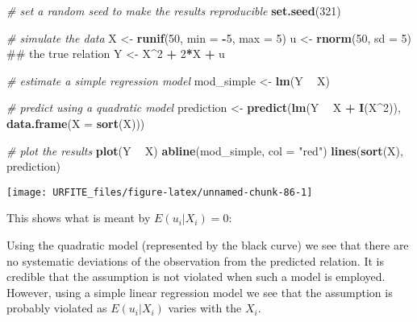 \documentclass[]{book}
\newenvironment{Shaded}{\begin{snugshade}}{\end{snugshade}}
\newcommand{\KeywordTok}[1]{\textcolor[rgb]{0.13,0.29,0.53}{\textbf{#1}}}
\newcommand{\DataTypeTok}[1]{\textcolor[rgb]{0.13,0.29,0.53}{#1}}
\newcommand{\DecValTok}[1]{\textcolor[rgb]{0.00,0.00,0.81}{#1}}
\newcommand{\StringTok}[1]{\textcolor[rgb]{0.31,0.60,0.02}{#1}}
\newcommand{\CommentTok}[1]{\textcolor[rgb]{0.56,0.35,0.01}{\textit{#1}}}
\newcommand{\OperatorTok}[1]{\textcolor[rgb]{0.81,0.36,0.00}{\textbf{#1}}}
\newcommand{\NormalTok}[1]{#1}
\theoremstyle{definition}
\theoremstyle{definition}
\theoremstyle{definition}
\theoremstyle{remark}
\begin{document}
\begin{Shaded}
\begin{Highlighting}[]
\CommentTok{# set a random seed to make the results reproducible}
\KeywordTok{set.seed}\NormalTok{(}\DecValTok{321}\NormalTok{)}

\CommentTok{# simulate the data }
\NormalTok{X <-}\StringTok{ }\KeywordTok{runif}\NormalTok{(}\DecValTok{50}\NormalTok{, }\DataTypeTok{min =} \OperatorTok{-}\DecValTok{5}\NormalTok{, }\DataTypeTok{max =} \DecValTok{5}\NormalTok{)}
\NormalTok{u <-}\StringTok{ }\KeywordTok{rnorm}\NormalTok{(}\DecValTok{50}\NormalTok{, }\DataTypeTok{sd =} \DecValTok{5}\NormalTok{)  }
\NormalTok{## the true relation  }
\NormalTok{Y <-}\StringTok{ }\NormalTok{X}\OperatorTok{^}\DecValTok{2} \OperatorTok{+}\StringTok{ }\DecValTok{2}\OperatorTok{*}\NormalTok{X }\OperatorTok{+}\StringTok{ }\NormalTok{u                }

\CommentTok{# estimate a simple regression model }
\NormalTok{mod_simple <-}\StringTok{ }\KeywordTok{lm}\NormalTok{(Y }\OperatorTok{~}\StringTok{ }\NormalTok{X)}

\CommentTok{# predict using a quadratic model }
\NormalTok{prediction <-}\StringTok{ }\KeywordTok{predict}\NormalTok{(}\KeywordTok{lm}\NormalTok{(Y }\OperatorTok{~}\StringTok{ }\NormalTok{X }\OperatorTok{+}\StringTok{  }\KeywordTok{I}\NormalTok{(X}\OperatorTok{^}\DecValTok{2}\NormalTok{)), }\KeywordTok{data.frame}\NormalTok{(}\DataTypeTok{X =} \KeywordTok{sort}\NormalTok{(X)))}

\CommentTok{# plot the results}
\KeywordTok{plot}\NormalTok{(Y }\OperatorTok{~}\StringTok{ }\NormalTok{X)}
\KeywordTok{abline}\NormalTok{(mod_simple, }\DataTypeTok{col =} \StringTok{"red"}\NormalTok{)}
\KeywordTok{lines}\NormalTok{(}\KeywordTok{sort}\NormalTok{(X), prediction)}
\end{Highlighting}
\end{Shaded}

\begin{center}\texttt{[image: URFITE\_files/figure-latex/unnamed-chunk-86-1]} \end{center}

This shows what is meant by \(E(u_i|X_i) = 0\):

Using the quadratic model (represented by the black curve) we see that
there are no systematic deviations of the observation from the predicted
relation. It is credible that the assumption is not violated when such a
model is employed. However, using a simple linear regression model we
see that the assumption is probably violated as \(E(u_i|X_i)\) varies
with the \(X_i\).
\end{document}
